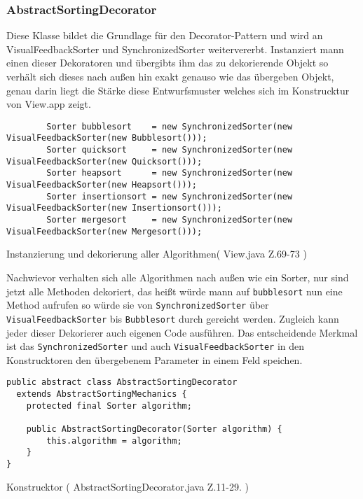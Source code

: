 \subsubsection{AbstractSortingDecorator}
Diese Klasse bildet die Grundlage für den Decorator-Pattern und wird an VisualFeedbackSorter und SynchronizedSorter weitervererbt.
Instanziert mann einen dieser Dekoratoren und übergibts ihm das zu dekorierende Objekt so verhält sich dieses nach außen hin 
exakt genauso wie das übergeben Objekt, genau darin liegt die Stärke diese Entwurfsmuster welches sich im Konstrucktur von View.app zeigt.

\begin{listing}[H]
    \begin{verbatim}
        Sorter bubblesort    = new SynchronizedSorter(new VisualFeedbackSorter(new Bubblesort()));
        Sorter quicksort     = new SynchronizedSorter(new VisualFeedbackSorter(new Quicksort()));
        Sorter heapsort      = new SynchronizedSorter(new VisualFeedbackSorter(new Heapsort()));
        Sorter insertionsort = new SynchronizedSorter(new VisualFeedbackSorter(new Insertionsort()));
        Sorter mergesort     = new SynchronizedSorter(new VisualFeedbackSorter(new Mergesort()));    
    \end{verbatim}
    \caption{Instanzierung und dekorierung aller Algorithmen( View.java Z.69-73 )}
    \label{code:app:startup}
\end{listing}
Nachwievor verhalten sich alle Algorithmen nach außen wie ein Sorter, nur sind jetzt alle Methoden dekoriert, das heißt würde mann auf
\texttt{bubblesort} nun eine Method aufrufen so würde sie von \texttt{SynchronizedSorter} über \texttt{VisualFeedbackSorter} bis \texttt{Bubblesort}
durch gereicht werden. Zugleich kann jeder dieser Dekorierer auch eigenen Code ausführen.
Das entscheidende Merkmal ist das \texttt{SynchronizedSorter} und auch \texttt{VisualFeedbackSorter} in den Konstrucktoren den übergebenem 
Parameter in einem Feld speichen.
\begin{listing}[H]
    \begin{verbatim}
public abstract class AbstractSortingDecorator 
  extends AbstractSortingMechanics {
    protected final Sorter algorithm;

    public AbstractSortingDecorator(Sorter algorithm) {
        this.algorithm = algorithm;
    }
} 
    \end{verbatim}
    \caption{ Konstrucktor ( AbstractSortingDecorator.java Z.11-29. )}
    \label{code:app:startup}
\end{listing}
